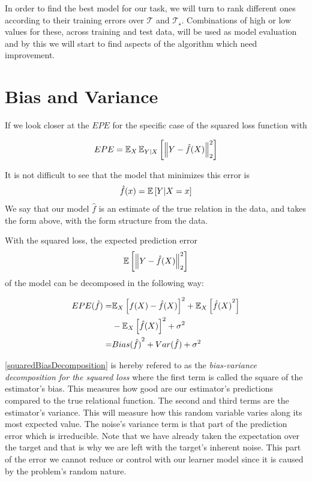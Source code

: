 In order to find the best model for our task, we will turn to rank different ones according to their training errors over $\mathcal{T}$ and $\mathcal{T_s}$.
Combinations of high or low values for these, across training and test data, will be used as model evaluation and by this we will start to find aspects of the algorithm which need improvement.

\section{Bias and Variance}\label{section-biasVariance}

If we look closer at the $EPE$ for the specific case of the squared loss function with

\begin{equation}\label{squaredPE}
EPE = \operatorname{\mathbb{E}}_X \operatorname{\mathbb{E}}_{Y|X} \left[ \left\Vert Y - \hat{f}(X) \right\Vert_2^2 \right]
\end{equation}

It is not difficult to see that the model that minimizes this error is
$$\hat{f}(x) = \operatorname{\mathbb{E}} \left[ Y | X=x \right] $$
We say that our model $\hat{f}$ is an estimate of the true relation in the data, and takes the form above, with the form structure from the data.

With the squared loss, the expected prediction error
$$\operatorname{\mathbb{E}} \left[ \left\Vert Y - \hat{f}(X) \right\Vert_2^2 \right]$$
of the model can be decomposed in the following way:

\begin{equation}\label{squaredBiasDecomposition}
\begin{split}
EPE( \hat{f} ) = & {\operatorname{\mathbb{E}}_X \left[  f(X) - \hat{f}(X) \right]}^2 + \operatorname{\mathbb{E}}_X \left[ {\hat{f}(X)}^2 \right] \\
& - {\operatorname{\mathbb{E}}_X \left[ \hat{f}(X) \right] }^2 + \sigma^2 \\
= & {Bias(\hat{f})}^2 + Var(\hat{f}) + \sigma^2
\end{split}
\end{equation}


 \cref{squaredBiasDecomposition} is hereby refered to as the \textit{bias-variance decomposition for the squared loss} where the first term is called the square of the estimator's bias.
This measures how good are our estimator's predictions compared to the true relational function.
The second and third terms are the estimator's variance.
This will measure how this random variable varies along its most expected value.
The noise's variance term is that part of the prediction error which is irreducible.
Note that we have already taken the expectation over the target and that is why we are left with the target's inherent noise.
This part of the error we cannot reduce or control with our learner model since it is caused by the problem's random nature.


